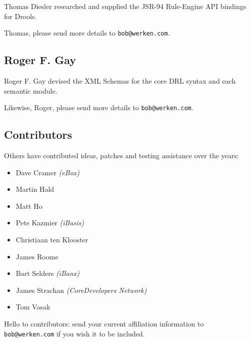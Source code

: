 Thomas Diesler researched and supplied the JSR-94 Rule-Engine API
bindings for Drools.

\begin{ednote}
Thomas, please send more details to \texttt{bob@werken.com}.
\end{ednote}

\subsection{Roger F. Gay}

Roger F. Gay devised the XML Schemas for the core DRL syntax and
each semantic module.

\begin{ednote}
Likewise, Roger, please send more details to \texttt{bob@werken.com}.
\end{ednote}

\subsection{Contributors}

Others have contributed ideas, patches and testing assistance
over the years:

\begin{itemize}
  \item Dave Cramer \emph{(eBox)}
  \item Martin Hald
  \item Matt Ho
  \item Pete Kazmier \emph{(iBasis)}
  \item Christiaan ten Klooster
  \item James Roome
  \item Bart Selders \emph{(iBanx)}
  \item James Strachan \emph{(CoreDevelopers Network)}
  \item Tom Vasak
\end{itemize}


\begin{ednote}
Hello to contributors: send your current affiliation information
to \texttt{bob@werken.com} if you wish it to be included.
\end{ednote}

